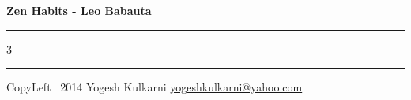 \documentclass[8pt,landscape]{article}
\begin{document}
\begin{center}
     \Large{\textbf{Zen Habits - Leo Babauta }}  %
\end{center}
\rule{\linewidth}{0.25pt}
\raggedright
\footnotesize
\begin{multicols}{3}




\rule{0.3\linewidth}{0.25pt}

\scriptsize
CopyLeft \textcopyleft\ 2014 Yogesh Kulkarni
\href{http://www.yogeshkulkarni.com}{yogeshkulkarni@yahoo.com}

\end{multicols}
\end{document}
